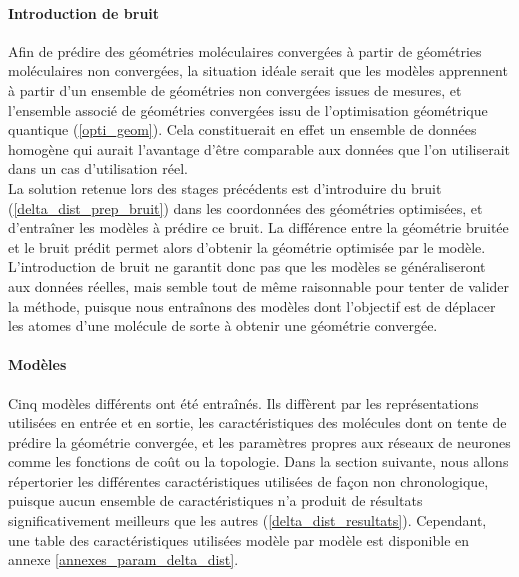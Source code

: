 \label{delta_dist_methodologie}

\paragraph{Introduction de bruit} Afin de prédire des géométries moléculaires convergées à partir de géométries moléculaires non convergées, la situation idéale serait que les modèles apprennent à partir d'un ensemble de géométries non convergées issues de mesures, et l'ensemble associé de géométries convergées issu de l'optimisation géométrique quantique (\ref{opti_geom}). Cela constituerait en effet un ensemble de données homogène qui aurait l'avantage d'être comparable aux données que l'on utiliserait dans un cas d'utilisation réel.\\
La solution retenue lors des stages précédents est d'introduire du bruit (\ref{delta_dist_prep_bruit}) dans les coordonnées des géométries optimisées, et d'entraîner les modèles à prédire ce bruit. La différence entre la géométrie bruitée et le bruit prédit permet alors d'obtenir la géométrie optimisée par le modèle. L'introduction de bruit ne garantit donc pas que les modèles se généraliseront aux données réelles, mais semble tout de même raisonnable pour tenter de valider la méthode, puisque nous entraînons des modèles dont l'objectif est de déplacer les atomes d'une molécule de sorte à obtenir une géométrie convergée.

\paragraph{Modèles} Cinq modèles différents ont été entraînés. Ils diffèrent par les représentations utilisées en entrée et en sortie, les caractéristiques des molécules dont on tente de prédire la géométrie convergée, et les paramètres propres aux réseaux de neurones comme les fonctions de coût ou la topologie. Dans la section suivante, nous allons répertorier les différentes caractéristiques utilisées de façon non chronologique, puisque aucun ensemble de caractéristiques n'a produit de résultats significativement meilleurs que les autres (\ref{delta_dist_resultats}). Cependant, une table des caractéristiques utilisées modèle par modèle est disponible en annexe \ref{annexes_param_delta_dist}.